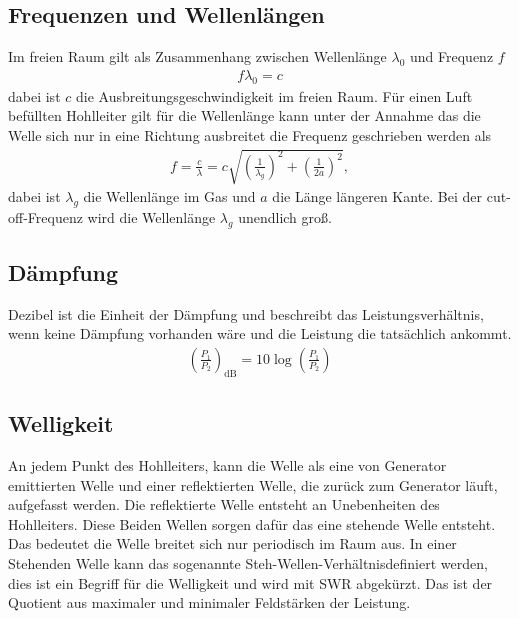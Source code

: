 \subsection{Frequenzen und Wellenlängen}
Im freien Raum gilt als Zusammenhang zwischen Wellenlänge $\lambda_0$ und Frequenz $f$
\begin{align}
	f\lambda_0=c
\end{align}
dabei ist $c$ die Ausbreitungsgeschwindigkeit im freien Raum. Für einen Luft befüllten Hohlleiter gilt für die Wellenlänge kann unter der Annahme das die Welle sich nur in eine Richtung ausbreitet die Frequenz geschrieben werden als 
\begin{align}
	f=	\frac{c}{\lambda}=c \sqrt{ \left( \frac{1}{\lambda_g} \right)^2 + \left( \frac{1}{2a} \right) ^2 },
	\label{eq:Hohlleiter_Frequenz}
\end{align}
dabei ist $\lambda_g$ die Wellenlänge im Gas und $a$ die Länge längeren Kante. Bei der cut-off-Frequenz wird die Wellenlänge $\lambda_g$ unendlich groß.
\subsection{Dämpfung}
Dezibel ist die Einheit der Dämpfung und beschreibt das Leistungsverhältnis, wenn keine Dämpfung vorhanden wäre und die Leistung die tatsächlich ankommt.
\begin{align}
	\left( \frac{P_1}{P_2} \right)_\text{dB}=10\log\left( \frac{P_1}{P_2}\right)
\end{align}

\subsection{Welligkeit}
An jedem Punkt des Hohlleiters, kann die Welle als eine von Generator emittierten Welle und einer reflektierten Welle, die zurück zum Generator läuft, aufgefasst werden. Die reflektierte Welle entsteht an Unebenheiten des Hohlleiters. Diese Beiden Wellen sorgen dafür das eine stehende Welle entsteht. Das bedeutet die Welle breitet sich nur periodisch im Raum aus. In einer Stehenden Welle kann das sogenannte \glqq Steh-Wellen-Verhältnis\grqq definiert werden, dies ist ein Begriff für die Welligkeit und wird mit SWR abgekürzt. Das ist der Quotient aus maximaler und minimaler Feldstärken der Leistung.